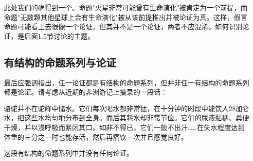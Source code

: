 此处我们的确得到一个。命题"火星非常可能曾有生命演化"被肯定为一个前提，而命题"无数颗其他星球上会有生命演化"被从该前提推出并被论证为真。这样，假言命题可能看上去很像一个论证，但其并不是一个论证，两者不应混淆。如何识别论证，是后面1.5节讨论的主题。

\subsection{有结构的命题系列与论证}

最后应强调指出，任一论证都是有结构的命题系列，但并非任一有结构的命题系列都是论证。请考虑从近期的非洲游记上摘录的一段话：

\begin{displayquote}
骆驼并不在驼峰中储水。它们每次喝水都非常猛，在十分钟的时段中能饮入28加仑水，把这些水均匀地分布到全身。而后其耗水却非常节俭。它们的尿液黏稠、粪便干燥，并以浅呼吸而紧闭其口。如非不得已，它们一般不出汗……在失水程度达到体重的三分之一时也能存活，然后再痛饮一次并且感觉良好。\cite{langewiesche1996}
\end{displayquote}

这段有结构的命题系列中并没有任何论证。

